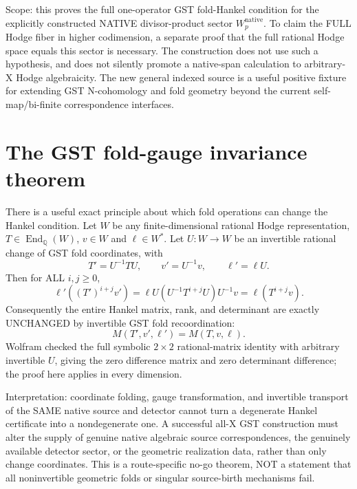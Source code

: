 \documentclass[11pt]{article}
\newcommand{\Q}{\mathbb Q}
\begin{document}
Scope: this proves the full one-operator GST fold-Hankel
condition for the explicitly constructed NATIVE divisor-product
sector \(W_p^{\mathrm{native}}\). To claim the FULL Hodge fiber
in higher codimension, a separate proof that the full rational
Hodge space equals this sector is necessary. The construction
does not use such a hypothesis, and does not silently promote
a native-span calculation to arbitrary-X Hodge algebraicity.
The new general indexed source is a useful positive fixture
for extending GST N-cohomology and fold geometry beyond the
current self-map/bi-finite correspondence interfaces.


\section{The GST fold-gauge invariance theorem}
There is a useful exact principle about which fold operations can change
the Hankel condition. Let \(W\) be any finite-dimensional rational Hodge
representation, \(T\in\operatorname{End}_{\Q}(W)\), \(v\in W\) and
\(\ell\in W^*\). Let \(U:W\to W\) be an invertible rational change
of GST fold coordinates, with
\[
T'=U^{-1}TU,\qquad v'=U^{-1}v,\qquad \ell'=\ell U.
\]
Then for ALL \(i,j\ge0\),
\[
\ell'((T')^{i+j}v')
 = \ell U (U^{-1}T^{i+j}U)U^{-1}v
 = \ell(T^{i+j}v).
\]
Consequently the entire Hankel matrix, rank, and determinant are exactly
UNCHANGED by invertible GST fold recoordination:
\[
\boxed{M(T',v',\ell')=M(T,v,\ell).}
\]
Wolfram checked the full symbolic \(2\times2\) rational-matrix
identity with arbitrary invertible \(U\), giving the zero difference
matrix and zero determinant difference; the proof here applies in
every dimension.

Interpretation: coordinate folding, gauge transformation, and
invertible transport of the SAME native source and detector cannot
turn a degenerate Hankel certificate into a nondegenerate one.
A successful all-X GST construction must alter the supply of
genuine native algebraic source correspondences, the genuinely
available detector sector, or the geometric realization data,
rather than only change coordinates. This is a route-specific
no-go theorem, NOT a statement that all noninvertible geometric
folds or singular source-birth mechanisms fail.
\end{document}
